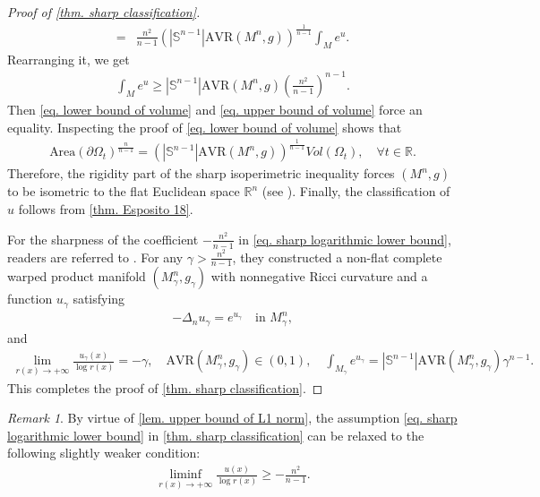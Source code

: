 \documentclass[12pt]{amsart}
\theoremstyle{plain}
\theoremstyle{definition}
\theoremstyle{remark}     %
\newtheorem{remark}[theorem]{Remark}
\begin{document}
\begin{proof}[Proof of \cref{thm. sharp classification}]
\begin{align*}
        =&\frac{n^2}{n-1}
        \left(|\mathbb{S}^{n-1}|\mathrm{AVR}(M^n,g)\right)^{\frac{1}{n-1}}
        \int_M e^u.
    \end{align*}
    Rearranging it, we get
    \begin{align}\label{eq. lower bound of volume}
        \int_M e^u \geq
        |\mathbb{S}^{n-1}| \mathrm{AVR}(M^n,g)
        \left(\frac{n^2}{n-1}\right)^{n-1}.
    \end{align}
    Then \cref{eq. lower bound of volume} and \cref{eq. upper bound of volume} force an equality. Inspecting the proof of \cref{eq. lower bound of volume} shows that
    \begin{align*}
        \text{Area}(\partial\Omega_t)^{\frac{n}{n-1}}
        = \left(|\mathbb{S}^{n-1}|\mathrm{AVR}(M^n,g)\right)^{\frac{1}{n-1}}
        Vol(\Omega_t),\quad 
        \forall t\in\mathbb{R}.
    \end{align*}
    Therefore, the rigidity part of the sharp isoperimetric inequality  forces $(M^n,g)$ to be isometric to the flat Euclidean space $\mathbb{R}^n$ (see  \cite[Theorem 1.2]{Bre23}). Finally, the classification of $u$ follows from \cref{thm. Esposito 18}.

    For the sharpness of the coefficient $-\frac{n^2}{n-1}$ in \cref{eq. sharp logarithmic lower bound}, readers are referred to \cite[Example 3.4]{CMR26}.
    For any $\gamma>\frac{n^2}{n-1}$, they constructed a non-flat complete warped product manifold $(M^n_\gamma,g_\gamma)$ with nonnegative Ricci curvature and a function $u_\gamma$ satisfying
    \begin{align*}
        -\Delta_n u_\gamma=e^{u_\gamma}\quad
        \text{in }M^n_\gamma,
    \end{align*}
    and 
    \begin{align}\label{example. sharpness of leading coefficient}
        \lim_{r(x)\to+\infty}\frac{u_\gamma(x)}{\log r(x)}=-\gamma,\quad 
        \mathrm{AVR}(M^n_\gamma,g_\gamma)
        \in(0,1),\quad 
        \int_{M_\gamma}e^{u_\gamma}
        =|\mathbb{S}^{n-1}|
        \mathrm{AVR}(M^n_\gamma,g_\gamma)
        \gamma^{n-1}.
    \end{align}
    This completes the proof of \cref{thm. sharp classification}.
\end{proof}
\begin{remark}
    By virtue of \cref{lem. upper bound of L1 norm}, the assumption \cref{eq. sharp logarithmic lower bound} in \cref{thm. sharp classification} can be relaxed to  the following slightly weaker condition:
    \begin{align*}
        \liminf_{r(x)\to+\infty}
        \frac{u(x)}{\log r(x)}\geq -\frac{n^2}{n-1}.
    \end{align*}
\end{remark}
\end{document}
